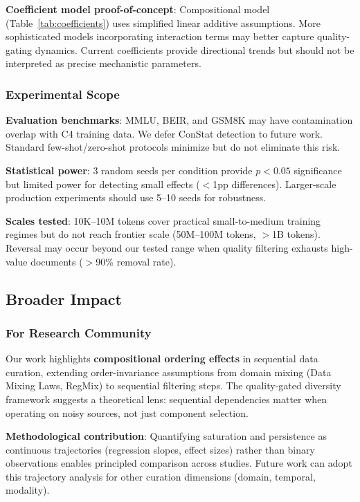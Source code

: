 \textbf{Coefficient model proof-of-concept}: Compositional model (Table~\ref{tab:coefficients}) uses simplified linear additive assumptions. More sophisticated models incorporating interaction terms may better capture quality-gating dynamics. Current coefficients provide directional trends but should not be interpreted as precise mechanistic parameters.

\subsubsection{Experimental Scope}

\textbf{Evaluation benchmarks}: MMLU, BEIR, and GSM8K may have contamination overlap with C4 training data. We defer ConStat detection to future work. Standard few-shot/zero-shot protocols minimize but do not eliminate this risk.

\textbf{Statistical power}: 3 random seeds per condition provide $p<0.05$ significance but limited power for detecting small effects ($<$1pp differences). Larger-scale production experiments should use 5--10 seeds for robustness.

\textbf{Scales tested}: 10K--10M tokens cover practical small-to-medium training regimes but do not reach frontier scale (50M--100M tokens, $>$1B tokens). Reversal may occur beyond our tested range when quality filtering exhausts high-value documents ($>$90\% removal rate).

\subsection{Broader Impact}

\subsubsection{For Research Community}

Our work highlights \textbf{compositional ordering effects} in sequential data curation, extending order-invariance assumptions from domain mixing (Data Mixing Laws, RegMix) to sequential filtering steps. The quality-gated diversity framework suggests a theoretical lens: sequential dependencies matter when operating on noisy sources, not just component selection.

\textbf{Methodological contribution}: Quantifying saturation and persistence as continuous trajectories (regression slopes, effect sizes) rather than binary observations enables principled comparison across studies. Future work can adopt this trajectory analysis for other curation dimensions (domain, temporal, modality).

